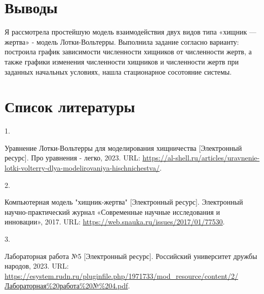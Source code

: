 \documentclass[
  12pt,
  a4paper,
]{scrreprt}
\newlength{\cslhangindent}
\newlength{\csllabelwidth}
\newlength{\cslentryspacingunit} %
\newenvironment{CSLReferences}[2] %
 {%
  \setlength{\parindent}{0pt}
  \ifodd #1
  \let\oldpar\par
  \def\par{\hangindent=\cslhangindent\oldpar}
  \fi
  \setlength{\parskip}{#2\cslentryspacingunit}
 }%
 {}
\newcommand{\CSLLeftMargin}[1]{\parbox[t]{\csllabelwidth}{#1}}
\newcommand{\CSLRightInline}[1]{\parbox[t]{\linewidth - \csllabelwidth}{#1}\break}
\begin{document}
\hypertarget{ux432ux44bux432ux43eux434ux44b}{%
\chapter{Выводы}\label{ux432ux44bux432ux43eux434ux44b}}

Я рассмотрела простейшую модель взаимодействия двух видов типа «хищник —
жертва» - модель Лотки-Вольтерры. Выполнила задание согласно варианту:
построила график зависимости численности хищников от численности жертв,
а также графики изменения численности хищников и численности жертв при
заданных начальных условиях, нашла стационарное сосотояние системы.

\hypertarget{ux441ux43fux438ux441ux43eux43a-ux43bux438ux442ux435ux440ux430ux442ux443ux440ux44b}{%
\chapter*{Список
литературы}\label{ux441ux43fux438ux441ux43eux43a-ux43bux438ux442ux435ux440ux430ux442ux443ux440ux44b}}

\hypertarget{refs}{}
\begin{CSLReferences}{0}{0}
\leavevmode{}%
\CSLLeftMargin{1. }%
\CSLRightInline{{Уравнение Лотки-Вольтерры для моделирования
хищничества} {[}Электронный ресурс{]}. Про уравнения - легко, 2023. URL:
\url{https://al-shell.ru/articles/uravnenie-lotki-volterry-dlya-modelirovaniya-hischnichestva/}.}

\leavevmode{}%
\CSLLeftMargin{2. }%
\CSLRightInline{{Компьютерная модель "хищник-жертва"} {[}Электронный
ресурс{]}. Электронный научно-практический журнал «Современные научные
исследования и инновации», 2017. URL:
\url{https://web.snauka.ru/issues/2017/01/77530}.}

\leavevmode{}%
\CSLLeftMargin{3. }%
\CSLRightInline{{Лабораторная работа №5} {[}Электронный ресурс{]}.
Российский университет дружбы народов, 2023. URL:
\url{https://esystem.rudn.ru/pluginfile.php/1971733/mod_resource/content/2/Лабораторная\%20работа\%20№\%204.pdf}.}

\end{CSLReferences}

\printbibliography
\end{document}
